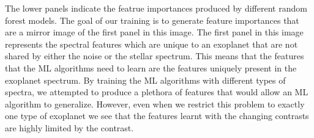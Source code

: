 The lower panels indicate the featrue importances produced by different random forest models.
The goal of our training is to generate feature importances that are a mirror image of the first panel in this image.
The first panel in this image represents the spectral features which are unique to an exoplanet that are not shared by either the noise or the stellar spectrum. 
This means that the features that the ML algorithms need to learn are the features uniquely present in the exoplanet spectrum. 
By training the ML algorithms with different types of spectra, we attempted to produce a plethora of features that would allow an ML algorithm to generalize. 
However, even when we restrict this problem to exactly one type of exoplanet we see that the features learnt with the changing contrasts are highly limited by the contrast.

